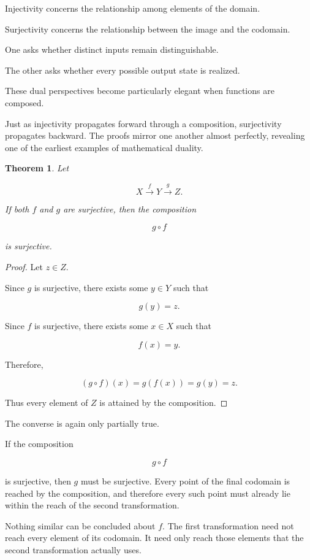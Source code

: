 \documentclass[11pt]{book}
\numberwithin{equation}{chapter}
\theoremstyle{definition}
\theoremstyle{plain}
\newtheorem{theorem}[definition]{Theorem}
\theoremstyle{remark}
\begin{document}
Injectivity concerns the relationship among elements of the domain.

Surjectivity concerns the relationship between the image and the codomain.

One asks whether distinct inputs remain distinguishable.

The other asks whether every possible output state is realized.

These dual perspectives become particularly elegant when functions are composed.

Just as injectivity propagates forward through a composition, surjectivity propagates backward. The proofs mirror one another almost perfectly, revealing one of the earliest examples of mathematical duality.

\begin{theorem}
Let

\[
X
\xrightarrow{\;f\;}
Y
\xrightarrow{\;g\;}
Z.
\]

If both \(f\) and \(g\) are surjective, then the composition

\[
g\circ f
\]

is surjective.
\end{theorem}

\begin{proof}
Let \(z\in Z\).

Since \(g\) is surjective, there exists some \(y\in Y\) such that

\[
g(y)=z.
\]

Since \(f\) is surjective, there exists some \(x\in X\) such that

\[
f(x)=y.
\]

Therefore,

\[
(g\circ f)(x)
=
g(f(x))
=
g(y)
=
z.
\]

Thus every element of \(Z\) is attained by the composition.
\end{proof}

The converse is again only partially true.

If the composition

\[
g\circ f
\]

is surjective, then \(g\) must be surjective. Every point of the final codomain is reached by the composition, and therefore every such point must already lie within the reach of the second transformation.

Nothing similar can be concluded about \(f\). The first transformation need not reach every element of its codomain. It need only reach those elements that the second transformation actually uses.
\end{document}
